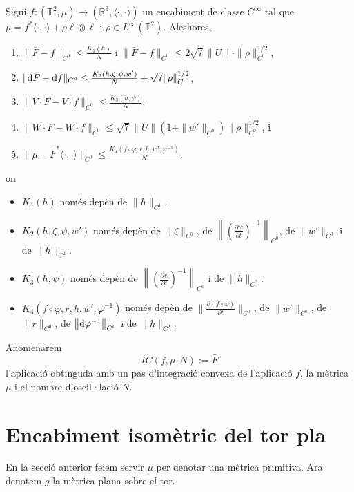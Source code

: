\begin{teo}\label{teo:OneStep}
    Sigui $f:(\mathbb T^2, \mu)\to(\mathbb R^3, \langle\cdot, \cdot\rangle)$ un encabiment de classe $C^\infty$ tal que $\mu = f^*\langle\cdot, \cdot\rangle + \rho\ell\otimes\ell$ i $\rho\in L^\infty(\mathbb T^2)$. Aleshores, 
    \begin{enumerate}
        \item $\|\bar F-f\|_{C^0}\le\frac{K_1(h)}{N}$ i $\|\bar F-f\|_{C^0}\le 2\sqrt7\|U\|\cdot\|\rho\|^{1/2}_{C^0}$,
        \item $\|\text d\bar F-\text df\|_{C^0}\le\frac{K_2(h,\zeta,\psi,w')}{N} + \sqrt7\|\rho\|^{1/2}_{C^0}$,
        \item $\|V\cdot\bar F-V\cdot f\|_{C^0}\le\frac{K_3(h,\psi)}{N}$,
        \item $\|W\cdot\bar F-W\cdot f\|_{C^0}\le\sqrt7\|U\|(1+\|w'\|_{C^0})\|\rho\|^{1/2}_{C^0}$, i
        \item $\|\mu - \bar F^*\langle\cdot, \cdot\rangle\|_{C^0}\le\frac{K_4(f\circ\varphi,r,h,w',\varphi^{-1})}{N}$.
    \end{enumerate}
    on 
    \begin{itemize}
        \item $K_1(h)$ només depèn de $\|h\|_{C^1}$.
        \item $K_2(h,\zeta,\psi,w')$ només depèn de $\|\zeta\|_{C^0}$, de $\left\|\left(  \frac{\partial\psi}{\partial t}\right)^{-1}\right\|_{C^0}$, de $\|w'\|_{C^0}$ i de $\|h\|_{C^2}$.
        \item $K_3(h,\psi)$ només depèn de $\left\|\left(  \frac{\partial\psi}{\partial t}\right)^{-1}\right\|_{C^0}$ i de $\|h\|_{C^2}$.
        \item $K_4(f\circ\varphi,r,h,w',\varphi^{-1})$ només depèn de $\|\frac{\partial(f\circ\varphi)}{\partial t}\|_{C^0}$, de $\|w'\|_{C^0}$, de $\|r\|_{C^0}$, de $\left\|\text d\varphi^{-1}\right\|_{C^0}$ i de $\|h\|_{C^2}$.
    \end{itemize}
\end{teo}
\begin{nota}
    Anomenarem 
    \begin{equation*}
        IC(f,\mu,N):=\bar F
    \end{equation*}
    l'aplicació obtinguda amb un pas d'integració convexa de l'aplicació $f$, la mètrica $\mu$ i el nombre d'oscil·lació $N$.
\end{nota}

\section{Encabiment isomètric del tor pla}
\begin{nota}
    En la secció anterior feiem servir $\mu$ per denotar una mètrica primitiva. Ara denotem $g$ la mètrica plana sobre el tor.
\end{nota}

